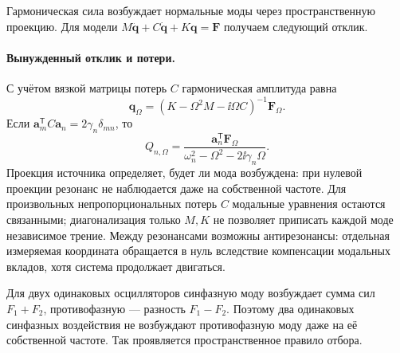 Гармоническая сила возбуждает нормальные моды через пространственную проекцию. Для модели $M\ddot{\bm q}+C\dot{\bm q}+K\bm q=\bm F$ получаем следующий отклик. \paragraph{Вынужденный отклик и потери.}
С учётом вязкой матрицы потерь $C$ гармоническая амплитуда равна
\begin{equation}
 \bm q_\Omega=(K-\Omega^2M-\ii\Omega C)^{-1}\bm F_\Omega.
\end{equation}
Если $\bm a_m^{\mathsf T}C\bm a_n=2\gamma_n\delta_{mn}$, то
\begin{equation}
 Q_{n,\Omega}=\frac{\bm a_n^{\mathsf T}\bm F_\Omega}
 {\omega_n^2-\Omega^2-2\ii\gamma_n\Omega}.
\end{equation}
Проекция источника определяет, будет ли мода возбуждена: при нулевой проекции резонанс не наблюдается даже на собственной частоте. Для произвольных непропорциональных потерь $C$ модальные уравнения остаются связанными; диагонализация только $M,K$ не позволяет приписать каждой моде независимое трение. Между резонансами возможны антирезонансы: отдельная измеряемая координата обращается в нуль вследствие компенсации модальных вкладов, хотя система продолжает двигаться.

Для двух одинаковых осцилляторов синфазную моду возбуждает сумма сил $F_1+F_2$, противофазную --- разность $F_1-F_2$. Поэтому два одинаковых синфазных воздействия не возбуждают противофазную моду даже на её собственной частоте. Так проявляется пространственное правило отбора.
